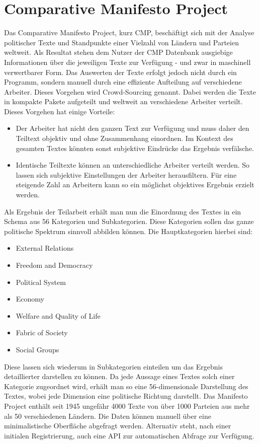 \section{Comparative Manifesto Project}
Das Comparative Manifesto Project, kurz CMP, beschäftigt sich mit der Analyse politischer Texte und Standpunkte einer Vielzahl von Ländern und Parteien weltweit. Als Resultat stehen dem Nutzer der CMP Datenbank ausgiebige Informationen über die jeweiligen Texte zur Verfügung - und zwar in maschinell verwertbarer Form.
Das Auswerten der Texte erfolgt jedoch nicht durch ein Programm, sondern manuell durch eine effiziente Aufteilung auf verschiedene Arbeiter. Dieses Vorgehen wird Crowd-Sourcing genannt. Dabei werden die Texte in kompakte Pakete aufgeteilt und weltweit an verschiedene Arbeiter verteilt. Dieses Vorgehen hat einige Vorteile:
\begin{itemize}
\item Der Arbeiter hat nicht den ganzen Text zur Verfügung und muss daher den Teiltext objektiv und ohne Zusammenhang einordnen. Im Kontext des gesamten Textes könnten sonst subjektive Eindrücke das Ergebnis verfälsche.
\item Identische Teiltexte können an unterschiedliche Arbeiter verteilt werden. So lassen sich subjektive Einstellungen der Arbeiter herausfiltern. Für eine steigende Zahl an Arbeitern kann so ein möglichst objektives Ergebnis erzielt werden.
\end{itemize}
Als Ergebnis der Teilarbeit erhält man nun die Einordnung des Textes in ein Schema aus 56 Kategorien und Subkategorien. Diese Kategorien sollen das ganze politische Spektrum sinnvoll abbilden können. Die Hauptkategorien hierbei sind:
\begin{itemize}
\item External Relations
\item Freedom and Democracy
\item Political System
\item Economy
\item Welfare and Quality of Life
\item Fabric of Society
\item Social Groups
\end{itemize}
Diese lassen sich wiederum in Subkategorien einteilen um das Ergebnis detaillierter darstellen zu können. Da jede Aussage eines Textes solch einer Kategorie zugeordnet wird, erhält man so eine 56-dimensionale Darstellung des Textes, wobei jede Dimension eine politische Richtung darstellt.
Das Manifesto Project enthält seit 1945 ungefähr 4000 Texte von über 1000 Parteien aus mehr als 50 verschiedenen Ländern.
Die Daten können manuell über eine minimalistische Oberfläche abgefragt werden. Alternativ steht, nach einer initialen Registrierung, auch eine API zur automatischen Abfrage zur Verfügung.

